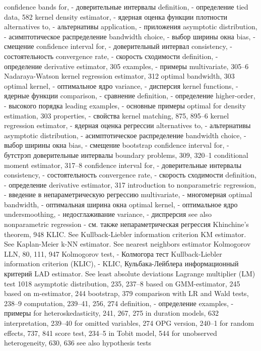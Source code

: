 confidence bands for, - доверительные интервалы 
definition, - определение
tied data, 582
kernel density estimator, - ядерная оценка функции плотности
alternatives to, - альтернативы
application, - приложения
asymptotic distribution, - асимптотическое распределение
bandwidth choice, - выбор ширины окна
bias, - смещение
confidence interval for, - доверительный интервал
consistency, - состоятельность
convergence rate, - скорость сходимости
definition, - определение
derivative estimator, 305
examples, - примеры
multivariate, 305–6
Nadaraya-Watson kernel regression estimator, 312 optimal bandwidth, 303
optimal kernel, - оптимальное ядро
variance, - дисперсия
kernel functions, - ядерные функции 
comparison, - сравнение
definition, - определение
higher-order, - высокого порядка 
leading examples, - основные примеры
optimal for density estimation, 303 
properties, - свойства
kernel matching, 875, 895–6 
kernel regression estimator, - ядерная оценка регрессии
alternatives to, - альтернативы
asymptotic distribution, - асимптотическое распределение
bandwidth choice, - выбор ширины окна
bias, - смещение
bootstrap confidence interval for, - бутстрэп доверительные интервалы
boundary problems, 309, 320–1
conditional moment estimator, 317–8
confidence interval for, - доверительные интервалы
consistency, - состоятельность
convergence rate, - скорость сходимости
definition, - определение
derivative estimator, 317
introduction to nonparametric regression, - введение в непараметрическую регрессию
multivariate, - многомерная 
optimal bandwidth, - оптимальная ширина окна
optimal kernel, - оптимальное ядро
undersmoothing, - недосглаживание
variance, - диспрерсия
see also nonparametric regression - см. также непараметрическая регрессия
Khinchine’s theorem, 948
KLIC. See Kullback-Liebler information criterion KM estimator. See Kaplan-Meier
k-NN estimator. See nearest neighbors estimator Kolmogorov LLN, 80, 111, 947
Kolmogorov test, - Колмогора тест
Kullback-Liebler information criterion (KLIC), - KLIC, Кульбака-Лейблера информационный критерий
LAD estimator. See least absolute deviations Lagrange multiplier (LM) test
1018
asymptotic distribution, 235, 237–8 based on GMM-estimator, 245 based on m-estimator, 244 bootstrap, 379
comparison with LR and Wald tests, 238–9 computation, 239–41, 256, 274
definition, - определение
examples, - примеры
for heteroskedasticity, 241, 267, 275 in duration models, 632 interpretation, 239–40
for omitted variables, 274
OPG version, 240–1
for random effects, 737, 841
score test, 234–5
in Tobit model, 544
for unobserved heterogeneity, 630, 636 see also hypothesis tests

